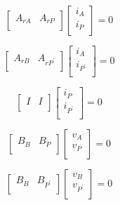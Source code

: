 \documentclass[10pt,psfig,letterpaper,twocolumn]{article}
\begin{document}
\begin{equation}
\left[\begin{array}{ll}
A_{rA} & A_{rP}\\
\end{array}\right]
\left[\begin{array}{l}
i_{A} \\
i_{P}\\
\end{array}\right]
= 0
\end{equation}

\begin{equation}
\left[\begin{array}{ll}
A_{rB} & A_{rP^{'}}\\
\end{array}\right]
\left[\begin{array}{l}
i_{A} \\
i_{P^{'}}\\
\end{array}\right]
= 0
\end{equation}

\begin{equation}
\left[\begin{array}{ll}
I & I\\
\end{array}\right]
\left[\begin{array}{l}
i_{P} \\
i_{P^{'}}\\
\end{array}\right]
= 0
\end{equation}

\begin{equation}
\left[\begin{array}{ll}
B_{B} & B_{P}\\
\end{array}\right]
\left[\begin{array}{l}
v_{A} \\
v_{P}\\
\end{array}\right]
= 0
\end{equation}

\begin{equation}
\left[\begin{array}{ll}
B_{B} & B_{P^{'}}\\
\end{array}\right]
\left[\begin{array}{l}
v_{B} \\
v_{P^{'}}\\
\end{array}\right]
= 0
\end{equation}
\end{document}
